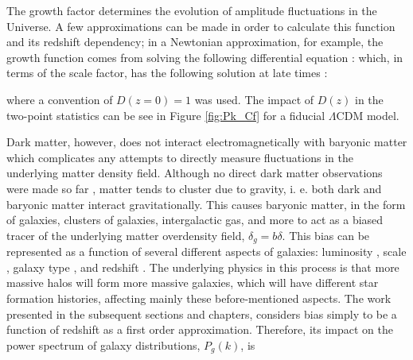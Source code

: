 \qquad The growth factor determines the evolution of amplitude fluctuations in the Universe. A few approximations can be made in order to calculate this function and its redshift dependency; in a Newtonian approximation, for example, the growth function comes from solving the following differential equation \citep{schneider_2016}:
which, in terms of the scale factor, has the following solution at late times \citep{dods,schneider_2016}:

where a convention of $D(z=0)=1$ was used. The impact of $D(z)$ in the two-point statistics can be see in Figure \ref{fig:Pk_Cf} for a fiducial $\Lambda$CDM model.

\qquad Dark matter, however, does not interact electromagnetically with baryonic matter which complicates any attempts to directly measure fluctuations in the underlying matter density field. Although no direct dark matter observations were made so far \citep{2017DarkMatterExpReview}, matter tends to cluster due to gravity, i. e. both dark and baryonic matter interact gravitationally. This causes baryonic matter, in the form of galaxies, clusters of galaxies, intergalactic gas, and more to act as a biased tracer of the underlying matter overdensity field, $\delta_g = b\delta$. This bias can be represented as a function of several different aspects of galaxies: luminosity \citep{2004PVP}, scale \citep{2008ScaleBias}, galaxy type \citep{2016AbramoSeccoLoureiro}, and redshift \citep{Peacock,dods}. The underlying physics in this process is that more massive halos will form more massive galaxies, which will have different star formation histories, affecting mainly these before-mentioned aspects. The work presented in the subsequent sections and chapters, considers bias simply to be a function of redshift as a first order approximation. Therefore, its impact on the power spectrum of galaxy distributions, $P_g(k)$, is 

